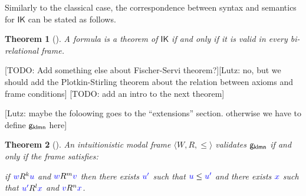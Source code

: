 \documentclass[a4paper]{article}
\theoremstyle{plain}
\newtheorem{theorem}{Theorem}[section]
\theoremstyle{definition}
\newcommand{\lutz}[1]{{\color{notgreen}[Lutz: #1]}}
\newcommand{\todo}[1]{{\color{red}[TODO: #1]}}
\newcommand*{\IK}{\mathsf{IK}}
\newcommand*{\lb}[1]{{\color{blue}{#1}}}
\newcommand*{\futs}[2]{\lb{#1}\le{\color{blue}{#2}}}
\newcommand*{\rel}{R}
\begin{document}
%

Similarly to the classical case, the correspondence between syntax and semantics for $\IK$ can be stated as follows.

\begin{theorem}[\cite{fischer-servi:84,plotkin:stirling:86}]\label{thm:plotkin}
	A formula is a theorem of $\IK$ if and only if it is valid in every bi-relational frame.
\end{theorem}

\todo{Add something else about Fischer-Servi theorem?}\lutz{no, but we should add the Plotkin-Stirling theorem about the relation between axioms and frame conditions} \todo{add an intro to the next theorem}


\lutz{maybe the foloowing goes to the ``extensions'' section. otherwise we have to define $\mathsf{g_{klmn}}$ here}
\begin{theorem}[\cite{plotkin:stirling:86}]
	An intuitionistic modal frame $\langle W, \rel, \le \rangle$ validates $\mathsf{g_{klmn}}$ if and only if the frame satisfies:
	
	if $\lb w R^{k} \lb u$ and $\lb w R^{m} \lb v$ then there exists $\lb{u'}$ such that $\futs{u}{u'}$ and there exists $\lb x$ such that $\lb{u'}R^{l}\lb x$ and $\lb v R^{n} \lb x$.
	
\end{theorem}
\end{document}
